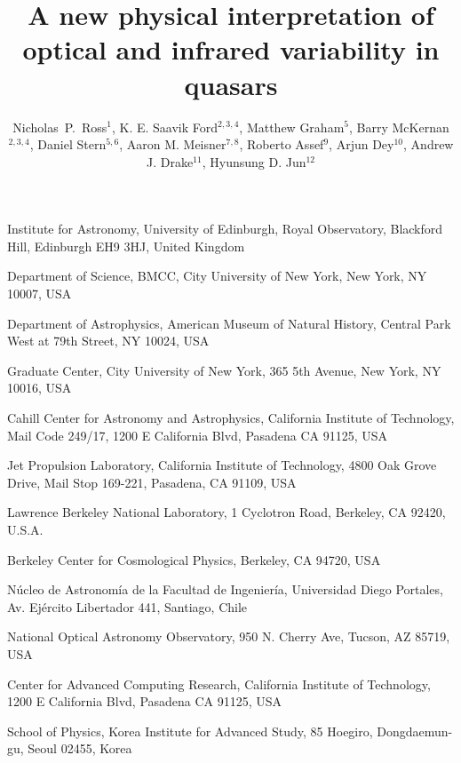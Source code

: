 \documentclass{nature}
\title{A new physical interpretation of optical and infrared variability in quasars}
\author{Nicholas~P.~Ross$^{1}$,    
K. E. Saavik Ford$^{2,3,4}$,  
Matthew Graham$^{5}$,  
Barry McKernan$^{2,3,4}$,  
Daniel Stern$^{5,6}$, 
Aaron M. Meisner$^{7,8}$, 
Roberto Assef$^{9}$, 
Arjun Dey$^{10}$,
Andrew J. Drake$^{11}$, 
Hyunsung D. Jun$^{12}$ 
}
\begin{document}
\maketitle

\begin{affiliations}
  \item Institute for Astronomy, University of Edinburgh, Royal Observatory, Blackford Hill, Edinburgh EH9 3HJ, United Kingdom 
  \item Department of Science, BMCC, City University of New York, New York, NY 10007, USA
 \item Department of Astrophysics, American Museum of Natural History, Central Park West at 79th Street, NY 10024, USA
 \item  Graduate Center, City University of New York, 365 5th Avenue, New York, NY 10016, USA
\item Cahill Center for Astronomy and Astrophysics, California Institute of Technology, Mail Code 249/17, 1200 E California Blvd, Pasadena CA 91125, USA
  \item Jet Propulsion Laboratory, California Institute of Technology, 4800 Oak Grove Drive, Mail Stop 169-221, Pasadena, CA 91109, USA 
  \item Lawrence Berkeley National Laboratory, 1 Cyclotron Road, Berkeley, CA 92420, U.S.A. 
  \item  Berkeley Center for Cosmological Physics, Berkeley, CA 94720, USA
\item N\'ucleo de Astronom\'ia de la Facultad de Ingenier\'ia,  Universidad Diego Portales, Av. Ej\'ercito Libertador 441, Santiago,
  Chile
\item National Optical Astronomy Observatory, 950 N. Cherry Ave, Tucson, AZ 85719, USA
\item Center for Advanced Computing Research, California Institute of Technology, 1200 E California Blvd, Pasadena CA 91125, USA
\item School of Physics, Korea Institute for Advanced Study, 85 Hoegiro, Dongdaemun-gu, Seoul 02455, Korea
\end{affiliations}
\end{document}
